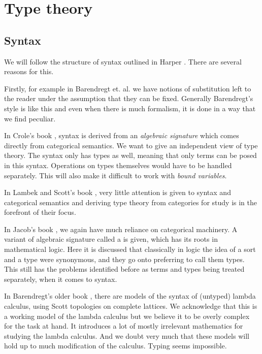 
\section{Type theory}

\subsection{Syntax}


We will follow the structure of syntax outlined in Harper \cite{harper_2016}. There are several reasons for this. 

Firstly, for example in Barendregt et. al. \cite{BarendregtHenk2013Lcwt} we have notions of substitution left to the reader under the assumption that they can be fixed. Generally Barendregt's style is like this and even when there is much formalism, it is done in a way that we find peculiar.

In Crole's book \cite{CroleRoyL1993Cft}, syntax is derived from an \textit{algebraic signature} which comes directly from categorical semantics. We want to give an independent view of type theory. The syntax only has types as well, meaning that only terms can be posed in this syntax. Operations on types themselves would have to be handled separately. This will also make it difficult to work with \textit{bound variables}.

In Lambek and Scott's book \cite{LambekJ1986Itho}, very little attention is given to syntax and categorical semantics and deriving type theory from categories for study is in the forefront of their focus.

In Jacob's book \cite{JacobsCLTT}, we again have much reliance on categorical machinery. A variant of algebraic signature called a  is given, which has its roots in mathematical logic. Here it is discussed that classically in logic the idea of a sort and a type were synonymous, and they go onto preferring to call them types. This still has the problems identified before as terms and types being treated separately, when it comes to syntax.

In Barendregt's older book \cite{barendregt1984lambda}, there are models of the syntax of (untyped) lambda calculus, using Scott topologies on complete lattices. We acknowledge that this is a working model of the lambda calculus but we believe it to be overly complex for the task at hand. It introduces a lot of mostly irrelevant mathematics for studying the lambda calculus. And we doubt very much that these models will hold up to much modification of the calculus. Typing seems impossible.

